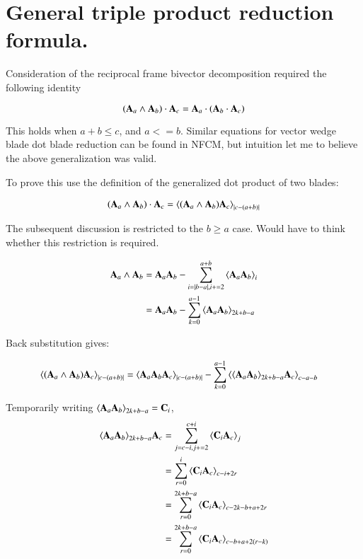 \documentclass{article}      %
\title{}
\author{Peeter Joot}
\newcommand{\gpgrade}[2] {{\left\langle{{#1}}\right\rangle}_{#2}}
\begin{document}

\maketitle{}

\section{ General triple product reduction formula. }

Consideration of the reciprocal frame bivector decomposition required the following identity

\begin{equation}
(\mathbf{A}_a \wedge \mathbf{A}_b) \cdot \mathbf{A}_c =
\mathbf{A}_a \cdot (\mathbf{A}_b \cdot \mathbf{A}_c)
\end{equation}

This holds when $a + b \le c$, and $a <= b$.  Similar equations for vector wedge blade dot blade reduction can be found in NFCM, but intuition let me to believe the above generalization was valid.

To prove this use the definition of the generalized dot product of two blades:

\begin{align*}
(\BA_a \wedge \BA_b) \cdot \BA_c
&= \gpgrade{ (\BA_a \wedge \BA_b) \BA_c }{\abs{c-(a+b)}} \\
\end{align*}

The subsequent discussion 
is restricted to the $b \ge a$ case.  Would have to think whether this restriction is required.

\begin{align*}\label{eqn:bladewedge}
\BA_a \wedge \BA_b 
&= \BA_a \BA_b - \sum_{i=\abs{b-a},i+=2}^{a+b}\gpgrade{\BA_a\BA_b}{i} \\
&= \BA_a \BA_b - \sum_{k=0}^{a-1}\gpgrade{\BA_a\BA_b}{2k + b - a} \\
\end{align*}

Back substitution gives:

\begin{align*}
\gpgrade{ (\BA_a \wedge \BA_b) \BA_c }{\abs{c-(a+b)}} 
&=
\gpgrade{ \BA_a \BA_b \BA_c }{\abs{c-(a+b)}} 
-
\sum_{k=0}^{a-1}
\gpgrade{ \gpgrade{\BA_a\BA_b}{2k + b - a} \BA_c }{c-a-b}
\end{align*}

Temporarily writing $\gpgrade{\BA_a\BA_b}{2k + b - a} = \BC_i$,
\begin{align*}
\gpgrade{\BA_a\BA_b}{2k + b - a} \BA_c
&= \sum_{j=c-i,j+=2}^{c+i} \gpgrade{ \BC_i \BA_c }{j} \\
&= \sum_{r=0}^{i} \gpgrade{ \BC_i \BA_c }{c-i+2r} \\
&= \sum_{r=0}^{2k+b-a} \gpgrade{ \BC_i \BA_c }{c-2k-b+a+2r} \\
&= \sum_{r=0}^{2k+b-a} \gpgrade{ \BC_i \BA_c }{c-b+a +2(r-k)} \\
\end{align*}
\end{document}
